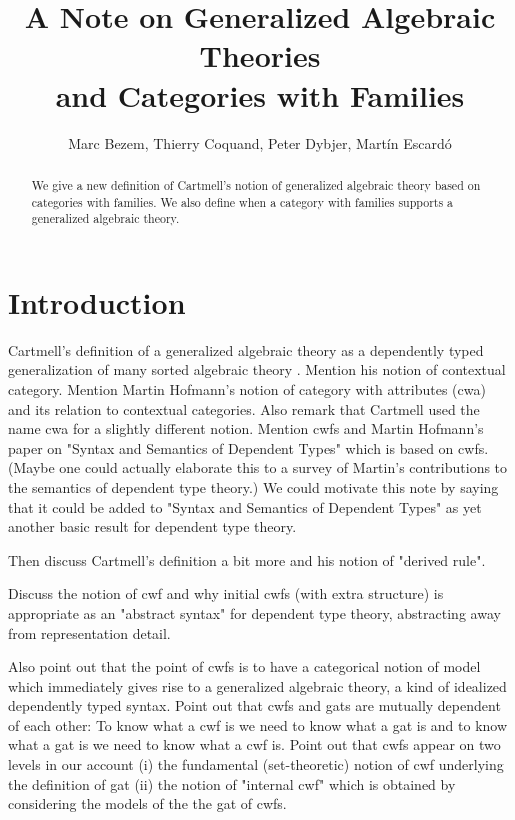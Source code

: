 \documentclass{lmcs}
\title{A Note on Generalized Algebraic Theories\\and Categories with Families}
\author{Marc Bezem, Thierry Coquand, Peter Dybjer, Mart\'in Escard\'o}
\begin{document}
\maketitle

\begin{abstract}
We give a new definition of Cartmell's notion of generalized algebraic theory based on categories with families. We also define when a category with families supports a generalized algebraic theory.
 \end{abstract}

\section{Introduction}

Cartmell's definition of a generalized algebraic theory as a dependently typed generalization of many sorted algebraic theory \cite{cartmell:phd,cartmell:}. Mention his notion of contextual category. Mention Martin Hofmann's notion of category with attributes (cwa) and its relation to contextual categories. Also remark that Cartmell used the name cwa for a slightly different notion. Mention cwfs and Martin Hofmann's paper on "Syntax and Semantics of Dependent Types" which is based on cwfs. (Maybe one could actually elaborate this to a survey of Martin's contributions to the semantics of dependent type theory.) We could motivate this note by saying that it could be added to "Syntax and Semantics of Dependent Types" as yet another basic result for dependent type theory.

Then discuss Cartmell's definition a bit more and his notion of "derived rule". 

Discuss the notion of cwf and why initial cwfs (with extra structure) is appropriate as an "abstract syntax" for dependent type theory, abstracting away from representation detail.

Also point out that the point of cwfs is to have a categorical notion of model which immediately gives rise to a generalized algebraic theory, a kind of idealized dependently typed syntax. Point out that cwfs and gats are mutually dependent of each other: To know what a cwf is we need to know what a gat is and to know what a gat is we need to know what a cwf is. Point out that cwfs appear on two levels in our account (i) the fundamental (set-theoretic) notion of cwf underlying the definition of gat (ii) the notion of "internal cwf" which is obtained by considering the models of the the gat of cwfs.
\end{document}
